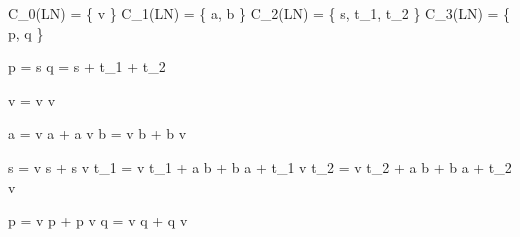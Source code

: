 

C_{0}(LN) = \{ v \}
C_{1}(LN) = \{ a, b \}
C_{2}(LN) = \{ s, t_{1}, t_{2} \}
C_{3}(LN) = \{ p, q \}


\partial p = s
\partial q = s + t_{1} + t_{2}


\Delta v = v \otimes v

\Delta a = v \otimes a + a \otimes v
\Delta b = v \otimes b + b \otimes v

\Delta s = v \otimes s + s \otimes v
\Delta t_{1} = v \otimes t_{1} + a \otimes b + b \otimes a + t_{1} \otimes v
\Delta t_{2} = v \otimes t_{2} + a \otimes b + b \otimes a + t_{2} \otimes v

\Delta p = v \otimes p + p \otimes v
\Delta q = v \otimes q + q \otimes v
